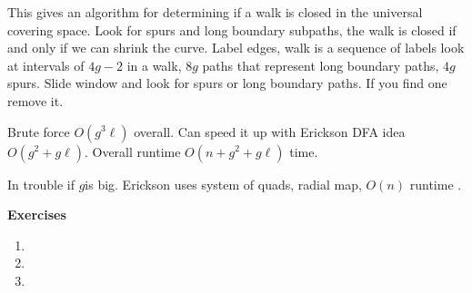 This gives an algorithm for determining if a walk is closed in the universal
covering space.
Look for spurs and long boundary subpaths, the walk is closed if and  only if
we can  shrink the curve.
Label edges, walk is a sequence of labels
look at intervals of $4g-2$ in a walk, $8g$ paths
that represent long boundary paths, $4g$ spurs.
Slide window and look for spurs or long boundary paths.
If you find one remove it.

Brute force $O(g^3\ell)$ overall.
Can speed it up with Erickson DFA  idea
$O(g^2+g\ell)$.
Overall runtime $O(n+g^2+g\ell)$ time.

In trouble if $g$is big. Erickson uses system of quads,
radial map, $O(n)$ runtime  \cite{erickson-whittlesey-2013}.








\noindent \textbf{Exercises}


\begin{enumerate}
	\item 
	
	\item 
	
	\item 
	
\end{enumerate}

\pagebreak
